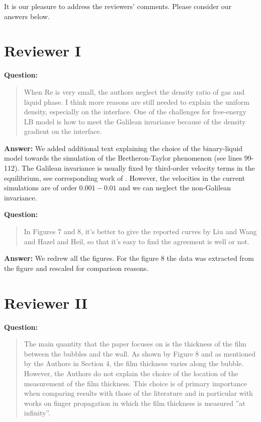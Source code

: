 \documentclass{article}
\begin{document}
It is our pleasure to address the reviewers' comments. Please consider our answers below.
\section{Reviewer I}

\textbf{Question:}
\begin{quotation}
When Re is very small, the authors neglect the density ratio of gas and liquid phase. I think more
reasons are still needed to explain the uniform density, especially on the interface. One of the
challenges for free-energy LB model is how to meet the Galilean invariance because of the density
gradient on the interface.
\end{quotation}

\textbf{Answer:} 
We added additional text explaining the choice of the binary-liquid model towards the simulation
of the Bretheron-Taylor phenomenon (see lines 99-112). The Galilean invariance is usually fixed by
third-order velocity terms in the equilibrium, see corresponding work of \citet{qian-galilean}.
However, the velocities in the current simulations are of order $0.001-0.01$ and we can neglect the
non-Galilean invariance.

\textbf{Question:}
\begin{quotation}
In Figures 7 and 8, it's better to give the reported curves by Liu and Wang and Hazel and Heil, so
that it's easy to find the agreement is well or not.
\end{quotation}

\textbf{Answer:} We redrew all the figures. For the figure 8 the data was extracted from the
figure and rescaled for comparison reasons.

\section{Reviewer II}

\textbf{Question:}
\begin{quotation}
The main quantity that the paper focuses on is the thickness of the film between the bubbles and the
wall. As shown by Figure 8 and as mentioned by the Authors in Section 4, the film thickness varies
along the bubble. However, the Authors do not explain the choice of the location of the measurement
of the film thickness. This choice is of primary importance when comparing results with those of
the
literature and in particular with works on finger propagation in which the film thickness is
measured
”at infinity”.
\end{quotation}
\end{document}
